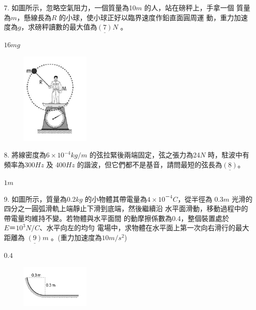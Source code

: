 \documentclass[cn,10pt,math=newtx,chinesefont=founder,device=ig]{elegantbook}
\begin{document}
\begin{example}
   7. 如圖所示，忽略空氣阻力，一個質量為10$m$ 的人，站在磅秤上，手拿一個
質量為$m$，懸線長為$R$ 的小球，使小球正好以臨界速度作鉛直面圓周運
動，重力加速度為$g$，求磅秤讀數的最大值為$\underline{(7)} N$ 。
\\
    \rightline{[全國聯招教甄109]}
\end{example}
\begin{solution}
    $16mg$
\end{solution}
\begin{figure}[htbp]
    \flushright
    \includegraphics[width=0.3\textwidth]{image/109全國27.png}
  \end{figure}
\newpage


\begin{example}
   8. 將線密度為$6\times10^{-4} kg/m$ 的弦拉緊後兩端固定，弦之張力為24$N$ 時，駐波中有頻率為300$Hz$ 及
400$Hz$ 的諧波，但它們都不是基音，請問最短的弦長為$\underline{(8)}$。\\
    \rightline{[全國聯招教甄109]}
\end{example}
\begin{solution}
    $1m$
\end{solution}

\newpage


\begin{example}
   9. 如圖所示，質量為0.2$kg$ 的小物體其帶電量為$4\times10^{－4} C$，從半徑為
0.3$m$ 光滑的四分之一圓弧滑軌上端靜止下滑到底端，然後繼續沿
水平面滑動，移動過程中的帶電量均維持不變。若物體與水平面間
的動摩擦係數為0.4，整個裝置處於$E＝10^3 N/C$、水平向左的均勻
電場中，求物體在水平面上第一次向右滑行的最大距離為
$\underline{(9)}  m$ 。(重力加速度為$10 m/s^2$)\\
    \rightline{[全國聯招教甄109]}
\end{example}
\begin{solution}
    $0.4$
\end{solution}
\begin{figure}[htbp]
    \flushright
    \includegraphics[width=0.3\textwidth]{image/109全國29.png}
  \end{figure}
\newpage
\end{document}
